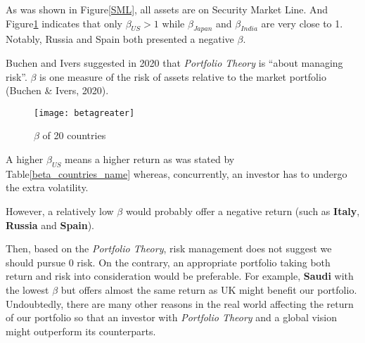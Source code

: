 \documentclass[
]{article}
\begin{document}
As was shown in Figure\ref{SML}, all assets are on Security Market Line.
And Figure\ref{betagreater} indicates that only \(\beta_{US} > 1\) while
\(\beta_{Japan}\) and \(\beta_{India}\) are very close to 1. Notably,
Russia and Spain both presented a negative \(\beta\).

Buchen and Ivers suggested in 2020 that \emph{Portfolio Theory} is
``about managing risk''. \(\beta\) is one measure of the risk of assets
relative to the market portfolio (Buchen \& Ivers, 2020).

\begin{figure}[!htb]
\begin{center}
\texttt{[image: betagreater]}
\end{center}
\caption{$\beta$ of 20 countries}\label{betagreater}
\end{figure}

A higher \(\beta_{US}\) means a higher return as was stated by
Table\ref{beta_countries_name} whereas, concurrently, an investor has to
undergo the extra volatility.

However, a relatively low \(\beta\) would probably offer a negative
return (such as \textbf{Italy}, \textbf{Russia} and \textbf{Spain}).

Then, based on the \emph{Portfolio Theory}, risk management does not
suggest we should pursue 0 risk. On the contrary, an appropriate
portfolio taking both return and risk into consideration would be
preferable. For example, \textbf{Saudi} with the lowest \(\beta\) but
offers almost the same return as UK might benefit our portfolio.
Undoubtedly, there are many other reasons in the real world affecting
the return of our portfolio so that an investor with \emph{Portfolio
Theory} and a global vision might outperform its counterparts.
\end{document}

